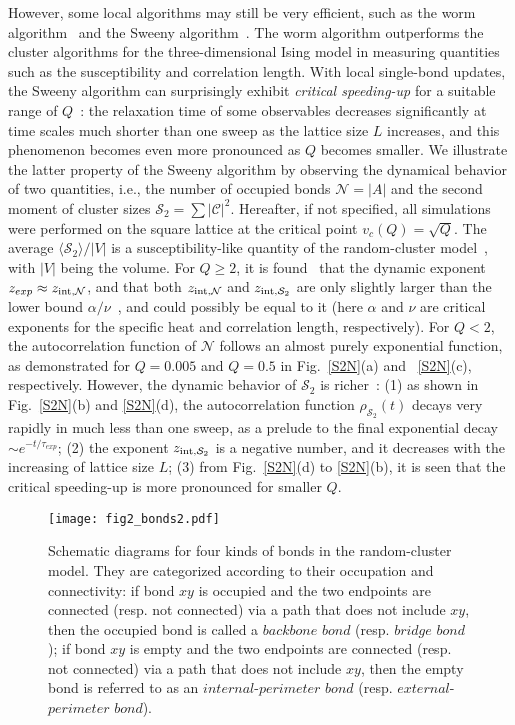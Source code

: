 \documentclass[aps,pre,twocolumn,superscriptaddress,longbibliography,floatfix]{revtex4-2}
\begin{document}
However, some local algorithms may still be very efficient, such as the worm algorithm~\cite{prokof2001worm} and the Sweeny algorithm~\cite{deng2007critical}.
The worm algorithm outperforms the cluster algorithms for the three-dimensional Ising model in measuring quantities such as the susceptibility and correlation length.
With local single-bond updates, the Sweeny algorithm can surprisingly exhibit {\it critical speeding-up} for {a suitable range of} $Q$~\cite{deng2007critical}:
the relaxation time of some observables decreases significantly at time scales much shorter than one sweep as the lattice size $L$ increases, and this phenomenon becomes even more pronounced as $Q$ becomes smaller. We illustrate the latter property of the Sweeny algorithm by observing the dynamical behavior of two quantities, i.e., the number of occupied bonds $ \mathcal{N} = |A|$ and the second moment of cluster sizes $\mathcal{S}_2 = \sum{|\mathcal{C }|^2}$.  
Hereafter, if not specified, all simulations were performed on the square lattice at the critical point $v_c(Q)=\sqrt{Q}$.
The average $\langle \mathcal{S}_2 \rangle / |V|$ is a susceptibility-like quantity of the random-cluster model~\cite{kasteleyn1969phase,fortuin1972random}, with $|V|$ being the volume. 
For $Q \ge 2$, it is found~\cite{deng2007critical} that the dynamic exponent $z_{exp} \approx z_{{\rm int},\mathcal{N}}$, and that both $z_{{\rm int},\mathcal{N}}$ and $z_{{\rm int},\mathcal{S}_2}$ are only slightly larger than the lower bound $\alpha / \nu$~\cite{li1989rigorous}, and could possibly be equal to it (here $\alpha$ and $\nu$ are critical exponents for the specific heat and correlation length, respectively). 
For $Q < 2$, the autocorrelation function of $\mathcal{N}$ follows an almost purely exponential function, as demonstrated for $Q=0.005$ and $Q=0.5$ in Fig.~\ref{S2N}(a) and ~\ref{S2N}(c), respectively. 
However, the dynamic behavior of $\mathcal{S}_2$ is richer~\cite{deng2007critical}: (1) as shown in Fig.~\ref{S2N}(b) and \ref{S2N}(d), the autocorrelation function $ \rho_{\mathcal{S}_2}(t)$ decays very rapidly in much less than one sweep, as a prelude to the final exponential decay $\sim e^{-t / \tau_{exp}}$;
(2) the exponent $z_{{\rm int},\mathcal{S}_2}$ is a negative number, and it decreases with the increasing of lattice size $L$;
(3) from Fig.~\ref{S2N}(d) to \ref{S2N}(b), it is seen that the critical speeding-up is more pronounced for smaller $Q$.

\begin{figure}[t]
\centering
\texttt{[image: fig2\_bonds2.pdf]}
\caption{Schematic diagrams for four kinds of bonds 
in the random-cluster model. They are categorized according to their occupation and connectivity: if bond $xy$ is occupied and the two endpoints are connected (resp. not connected) via a path that does not include $xy$, then the occupied bond is called a $backbone$ $bond$ (resp. $bridge$ $bond$); if bond $xy$ is empty and the two endpoints are connected (resp. not connected) via a path that does not include $xy$, then the empty bond is referred to as an $internal$-$perimeter$ $bond$ (resp. $external$-$perimeter$ $bond$).}
\label{bonds}
\end{figure}
\end{document}
